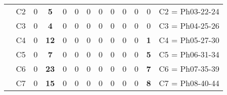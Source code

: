 \begin{table}[H]
{\begin{tabular}{|ccrrrrrrrrrrc|}
\multicolumn{1}{|c|}{}                                      & \multicolumn{1}{c|}{C2} & \multicolumn{1}{c|}{0}  & \multicolumn{1}{c|}{\textbf{5}}  & \multicolumn{1}{c|}{0}  & \multicolumn{1}{c|}{0}  & \multicolumn{1}{c|}{0}  & \multicolumn{1}{c|}{0}  & \multicolumn{1}{c|}{0}  & \multicolumn{1}{c|}{0}  & \multicolumn{1}{c|}{0}  & \multicolumn{1}{c|}{0}           & C2 = Ph03-22-24   \\ \cline{2-13}
\multicolumn{1}{|c|}{}                                      & \multicolumn{1}{c|}{C3} & \multicolumn{1}{c|}{0}  & \multicolumn{1}{c|}{\textbf{4}}  & \multicolumn{1}{c|}{0}  & \multicolumn{1}{c|}{0}  & \multicolumn{1}{c|}{0}  & \multicolumn{1}{c|}{0}  & \multicolumn{1}{c|}{0}  & \multicolumn{1}{c|}{0}  & \multicolumn{1}{c|}{0}  & \multicolumn{1}{c|}{0}           & C3 = Ph04-25-26   \\ \cline{2-13}
\multicolumn{1}{|c|}{}                                      & \multicolumn{1}{c|}{C4} & \multicolumn{1}{c|}{0}  & \multicolumn{1}{c|}{\textbf{12}} & \multicolumn{1}{c|}{0}  & \multicolumn{1}{c|}{0}  & \multicolumn{1}{c|}{0}  & \multicolumn{1}{c|}{0}  & \multicolumn{1}{c|}{0}  & \multicolumn{1}{c|}{0}  & \multicolumn{1}{c|}{0}  & \multicolumn{1}{c|}{\textbf{1}}  & C4 = Ph05-27-30   \\ \cline{2-13}
\multicolumn{1}{|c|}{}                                      & \multicolumn{1}{c|}{C5} & \multicolumn{1}{c|}{0}  & \multicolumn{1}{c|}{\textbf{7}}  & \multicolumn{1}{c|}{0}  & \multicolumn{1}{c|}{0}  & \multicolumn{1}{c|}{0}  & \multicolumn{1}{c|}{0}  & \multicolumn{1}{c|}{0}  & \multicolumn{1}{c|}{0}  & \multicolumn{1}{c|}{0}  & \multicolumn{1}{c|}{\textbf{5}}  & C5 = Ph06-31-34   \\ \cline{2-13}
\multicolumn{1}{|c|}{}                                      & \multicolumn{1}{c|}{C6} & \multicolumn{1}{c|}{0}  & \multicolumn{1}{c|}{\textbf{23}} & \multicolumn{1}{c|}{0}  & \multicolumn{1}{c|}{0}  & \multicolumn{1}{c|}{0}  & \multicolumn{1}{c|}{0}  & \multicolumn{1}{c|}{0}  & \multicolumn{1}{c|}{0}  & \multicolumn{1}{c|}{0}  & \multicolumn{1}{c|}{\textbf{7}}  & C6 = Ph07-35-39   \\ \cline{2-13}
\multicolumn{1}{|c|}{}                                      & \multicolumn{1}{c|}{C7} & \multicolumn{1}{c|}{0}  & \multicolumn{1}{c|}{\textbf{15}} & \multicolumn{1}{c|}{0}  & \multicolumn{1}{c|}{0}  & \multicolumn{1}{c|}{0}  & \multicolumn{1}{c|}{0}  & \multicolumn{1}{c|}{0}  & \multicolumn{1}{c|}{0}  & \multicolumn{1}{c|}{0}  & \multicolumn{1}{c|}{\textbf{8}}  & C7 = Ph08-40-44   \\ \cline{2-13}

\end{tabular}}
\end{table}
